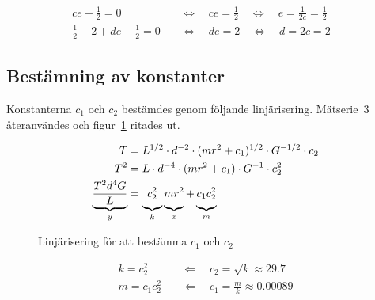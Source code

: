 \documentclass[a4paper,12pt]{article}
\begin{document}
\begin{align}
  ce - \frac{1}{2} = 0 \quad &\Leftrightarrow \quad ce = \frac{1}{2} \quad \Leftrightarrow \quad e = \frac{1}{2c} = \frac{1}{2} & \\[0.5em]
  \frac{1}{2} - 2 + de - \frac{1}{2} = 0 \quad &\Leftrightarrow \quad de = 2 \quad \Leftrightarrow \quad d = 2c = 2 &
\end{align}

\subsection{Bestämning av konstanter}

Konstanterna $c_1$ och $c_2$ bestämdes genom följande linjärisering.
Mätserie~3 återanvändes och figur~\ref{fig:lin_c1_c2} ritades ut.

\begin{align}
  T &= L^{1/2} \cdot d^{-2} \cdot (m r^2 + c_1)^{1/2} \cdot G^{-1/2} \cdot c_2 \nonumber \\
  T^2 &= L \cdot d^{-4} \cdot (m r^2 + c_1) \cdot G^{-1} \cdot c_2^2 \nonumber \\
  \underbrace{\frac{T^2 d^4 G}{L}}_y &= \underbrace{c_2^2 \vphantom{\frac{T^2 d^4 G}{L}}}_k \underbrace{m r^2 \vphantom{\frac{T^2 d^4 G}{L}}}_x + \underbrace{c_1c_2^2 \vphantom{\frac{T^2 d^4 G}{L}}}_m
\end{align}

\begin{figure}[h!]
  \caption{Linjärisering för att bestämma $c_1$ och $c_2$}
  \label{fig:lin_c1_c2}
\end{figure}

\begin{align}
  k = c_2^2 \quad &\Leftarrow \quad c_2 = \sqrt{k} \approx 29.7\\
  m = c_1c_2^2 \quad &\Leftarrow \quad c_1 = \frac{m}{k} \approx 0.00089
\end{align}
\end{document}
